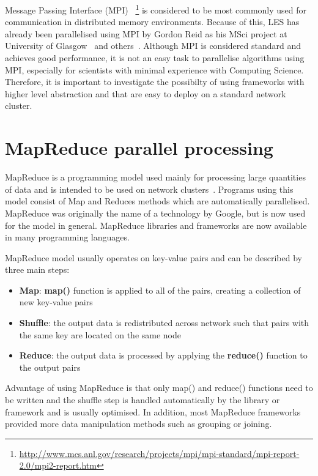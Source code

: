 \documentclass{l4proj}
\begin{document}
Message Passing Interface (MPI)
~\footnote{\url{http://www.mcs.anl.gov/research/projects/mpi/mpi-standard/mpi-report-2.0/mpi2-report.htm}} 
is considered to be most commonly used for communication in distributed memory environments.
Because of this, LES has already been parallelised using MPI by Gordon Reid as his MSci project at University of Glasgow~\cite{les_mpi} and others~\cite{les_palm}. Although MPI is considered standard and achieves good performance, it
is not an easy task to parallelise algorithms using MPI, especially for scientists with minimal
experience with Computing Science. Therefore, it is important to investigate the possibilty
of using frameworks with higher level abstraction and that are easy to deploy on a standard
network cluster.

\section{MapReduce parallel processing}

MapReduce is a programming model used mainly for processing large quantities of data
and is intended to be used on network clusters~\cite{map_reduce}. Programs using this model consist of Map and Reduces
methods which are automatically parallelised. MapReduce was originally the name of a technology by
Google, but is now used for the model in general. MapReduce libraries and frameworks are now 
available in many programming languages.

MapReduce model usually operates on key-value pairs and can be described by three main steps:

\begin{itemize}  
\item \textbf{Map}: \textbf{map()} function is applied to all of the pairs, creating a collection of new key-value pairs
\item \textbf{Shuffle}: the output data is redistributed across network such that pairs with the same key are located on the same node
\item \textbf{Reduce}: the output data is processed by applying the \textbf{reduce()} function to the output pairs
\end{itemize}

Advantage of using MapReduce is that only map() and reduce() functions need to be written and
the shuffle step is handled automatically by the library or framework and is usually optimised. 
In addition, most MapReduce frameworks provided more data manipulation methods such as grouping or 
joining.
\end{document}
